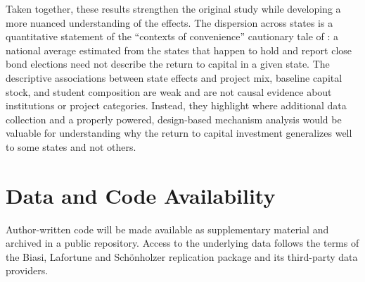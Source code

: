 \documentclass[12pt]{article}
\begin{document}
Taken together, these results strengthen the original study while developing a more nuanced understanding of the effects. The dispersion across states is a quantitative statement of the ``contexts of convenience'' cautionary tale of \citet{handel2024contexts}: a national average estimated from the states that happen to hold and report close bond elections need not describe the return to capital in a given state. The descriptive associations between state effects and project mix, baseline capital stock, and student composition are weak and are not causal evidence about institutions or project categories. Instead, they highlight where additional data collection and a properly powered, design-based mechanism analysis would be valuable for understanding why the return to capital investment generalizes well to some states and not others.

\section*{Data and Code Availability}

Author-written code will be made available as supplementary material and archived in a public repository. Access to the underlying data follows the terms of the Biasi, Lafortune and Sch\"onholzer replication package and its third-party data providers.


\end{document}
